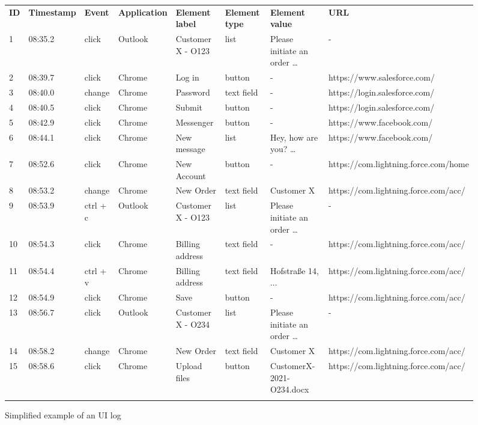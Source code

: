 \begin{figure}[h!]
\centering
 \begin{adjustbox}{max width=\textwidth}
\begin{tabular}{llllllll}
\hline\noalign{\smallskip}\noalign{\smallskip}
\textbf{ID} &\textbf{Timestamp}&\textbf{Event}&\textbf{Application}&\textbf{Element label}&\textbf{Element type}&\textbf{Element value}&\textbf{URL}\\
\noalign{\smallskip}\hline\noalign{\smallskip}
1&08:35.2&click&Outlook&Customer X - O123&list&Please initiate an order …&-\\\noalign{\smallskip}
2&08:39.7&click&Chrome&Log in&button&-&https://www.salesforce.com/\\\noalign{\smallskip}
3&08:40.0&change&Chrome&Password&text field&-&https://login.salesforce.com/\\\noalign{\smallskip}
4&08:40.5&click&Chrome&Submit&button&-&https://login.salesforce.com/\\\noalign{\smallskip}
5&08:42.9&click&Chrome&Messenger&button&-&https://www.facebook.com/\\\noalign{\smallskip}
6&08:44.1&click&Chrome&New message&list&Hey, how are you? …&https://www.facebook.com/\\\noalign{\smallskip}
7&08:52.6&click&Chrome&New Account&button&-&https://com.lightning.force.com/home\\\noalign{\smallskip}
8&08:53.2&change&Chrome&New Order&text field&Customer X&https://com.lightning.force.com/acc/\\\noalign{\smallskip}
9&08:53.9&ctrl + c&Outlook &Customer X - O123&list&Please initiate an order …&-\\\noalign{\smallskip}
10&08:54.3&click&Chrome&Billing address&text field&-&https://com.lightning.force.com/acc/\\\noalign{\smallskip}
11&08:54.4&ctrl + v&Chrome&Billing address&text field&Hofstraße 14, ... &https://com.lightning.force.com/acc/\\\noalign{\smallskip}
12&08:54.9&click&Chrome&Save&button&-&https://com.lightning.force.com/acc/\\\noalign{\smallskip}
13&08:56.7&click&Outlook&Customer X - O234&list&Please initiate an order …&-\\\noalign{\smallskip}
14&08:58.2&change&Chrome&New Order&text field&Customer X&https://com.lightning.force.com/acc/\\\noalign{\smallskip}
15&08:58.6&click&Chrome&Upload files&button&CustomerX-2021-O234.docx&https://com.lightning.force.com/acc/\\\noalign{\smallskip}
\hline\noalign{\smallskip}
\end{tabular}
\end{adjustbox}
\caption{Simplified example of an UI log}
\label{fig:example}
\end{figure}

